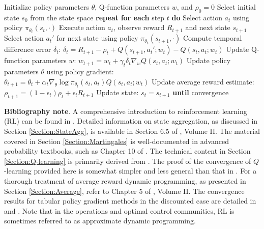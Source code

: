\documentclass[letter,11pt]{article}
\begin{document}
\begin{algorithm} \label{Algorithm:Actor}
\caption{Q-function Actor-Critic Method}
\begin{algorithmic}[1]
\State Initialize policy parameters \(\theta\), Q-function parameters \(w\), and \(\rho_0 = 0\)
\State Select initial state \(s_0\) from the state space
\State \textbf{repeat} 
    \State \quad \textbf{for each} step \(t\) \textbf{do}
        \State \quad\quad Select action \(a_t\) using policy \(\pi_{\theta_t}(s_t, \cdot)\)
        \State \quad\quad Execute action \(a_t\), observe reward \(R_{t+1}\) and next state \(s_{t+1}\)
        \State \quad\quad Select action \(a_{t}'\) for next state using policy \(\pi_{\theta_t}(s_{t+1}, \cdot)\)
        \State \quad\quad Compute temporal difference error \(\delta_t\):
        \State \quad\quad \(\delta_t = R_{t+1} - \rho_t + Q(s_{t+1}, a_{t}'; w_t) - Q(s_t, a_t; w_t)\)
        \State \quad\quad Update Q-function parameters \(w\):
        \State \quad\quad \(w_{t+1} = w_t + \gamma_t \delta_t \nabla_w Q(s_t, a_t; w_t)\)
        \State \quad\quad Update policy parameters \(\theta\) using policy gradient:
        \State \quad\quad \(\theta_{t+1} = \theta_t + \alpha_t \nabla_\theta \log \pi_{\theta_{t} }(s_t, a_t) Q(s_t, a_t; w_t)\)
        \State \quad\quad Update average reward estimate:
        \State \quad\quad \(\rho_{t+1} = (1 - \epsilon_t) \rho_t + \epsilon_t R_{t+1}\)
        \State \quad\quad Update state:
        \State \quad\quad \(s_t = s_{t+1}\)
    \State \textbf{until} convergence 
\end{algorithmic}
\end{algorithm}






\textbf{Bibliography note}.
A comprehensive introduction to reinforcement learning (RL) can be found in \cite{sutton2018reinforcement}. Detailed information on state aggregation, as discussed in Section \ref{Section:StateAgg}, is available in Section 6.5 of \cite{bertsekas2012dynamic}, Volume II. 
The material covered in Section \ref{Section:Martingales} is well-documented in advanced probability textbooks, such as Chapter 10 of \cite{dudley2018real}. The technical content in Section \ref{Section:Q-learning} is primarily derived from \cite{bertsekas1996neuro}. The proof of the convergence of $Q$-learning provided here is somewhat simpler and less general than that in \cite{bertsekas1996neuro}. 
For a thorough treatment of average reward dynamic programming, as presented in Section \ref{Section:Average}, refer to Chapter 5 of \cite{bertsekas2012dynamic}, Volume II. The convergence results for tabular policy gradient methods in the discounted case are detailed in \cite{agarwal2021theory} and \cite{bhandari2024global}. 
Note that in the operations and optimal control communities, RL is sometimes referred to as approximate dynamic programming.
\end{document}
